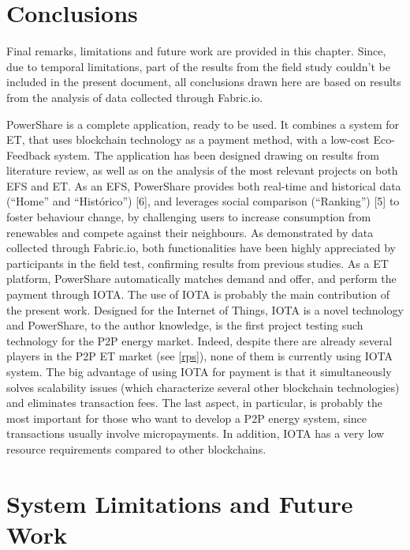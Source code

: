 \cleardoublepage
\label{chap:conclusion1}


\section{Conclusions}

Final remarks, limitations and future work are provided in this chapter. Since, due to temporal limitations, part of the results from the field study couldn’t be included in the present document, all conclusions drawn here are based on results from the analysis of data collected through Fabric.io. 
	
PowerShare is a complete application, ready to be used. It combines a system for \ac{ET}, that uses blockchain technology as a payment method, with a low-cost Eco-Feedback system. The application has been designed drawing on results from literature review, as well as on the analysis of the most relevant projects on both \ac{EFS} and \ac{ET}.
As an EFS, PowerShare provides both real-time and historical data (“Home” and “Histórico”) [6], and leverages social comparison (“Ranking”) [5] to foster behaviour change, by challenging users to increase consumption from renewables and compete against their neighbours. As demonstrated by data collected through Fabric.io, both functionalities have been highly appreciated by participants in the field test, confirming results from previous studies.
As a \ac{ET} platform, PowerShare automatically matches demand and offer, and perform the payment through IOTA. The use of IOTA is probably the main contribution of the present work. Designed for the Internet of Things, IOTA is a novel technology and PowerShare, to the author knowledge, is the first project testing such technology for the P2P energy market. Indeed, despite there are already several players in the \ac{P2P} \ac{ET} market (see \cref{rps}), none of them is currently using IOTA system. The big advantage of using IOTA for payment is that it simultaneously solves scalability issues (which characterize several other blockchain technologies) and eliminates transaction fees. The last aspect, in particular, is probably the most important for those who want to develop a P2P energy system, since transactions usually involve micropayments. In addition, IOTA has a very low resource requirements compared to other blockchains. 



\section{System Limitations and Future Work}
